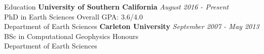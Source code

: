 \begin{rSection}{Education}
    {\bf University of Southern California} \hfill {\em August 2016 - Present} \\
    PhD in Earth Sciences \hfill { Overall GPA: 3.6/4.0} \\
    Department of Earth Sciences
    \smallbreak
    {\bf Carleton University} \hfill {\em September 2007 - May 2013} \\
    BSc in Computational Geophysics \hfill {Honours} \\
    Department of Earth Sciences  
\end{rSection}